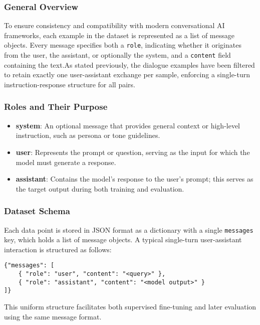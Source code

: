 \subsubsection{General Overview}

To ensure consistency and compatibility with modern conversational AI frameworks, each example in the dataset is represented as a list of message objects. Every message specifies both a \texttt{role}, indicating whether it originates from the user, the assistant, or optionally the system, and a \texttt{content} field containing the text.As stated previously, the dialogue examples have been filtered to retain exactly one user-assistant exchange per sample, enforcing a single-turn instruction-response structure for all pairs.

\subsubsection{Roles and Their Purpose}

\begin{itemize}
\item \textbf{system}: An optional message that provides general context or high-level instruction, such as persona or tone guidelines.
\item \textbf{user}: Represents the prompt or question, serving as the input for which the model must generate a response.
\item \textbf{assistant}: Contains the model's response to the user's prompt; this serves as the target output during both training and evaluation.
\end{itemize}

\subsubsection{Dataset Schema}
Each data point is stored in JSON format as a dictionary with a single \texttt{messages} key, which holds a list of message objects. A typical single-turn user-assistant interaction is structured as follows:
\begin{lstlisting}[caption={User–assistant message pair}]
{"messages": [
    { "role": "user", "content": "<query>" },
    { "role": "assistant", "content": "<model output>" }
]}
\end{lstlisting}
This uniform structure facilitates both supervised fine-tuning and later evaluation using the same message format.

